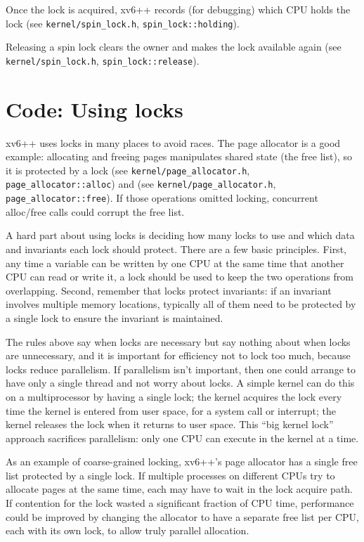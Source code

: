 Once the lock is acquired, xv6++ records (for debugging) which CPU holds the lock
(see \texttt{kernel/spin\_lock.h}, \texttt{spin\_lock::holding}).

Releasing a spin lock clears the owner and makes the lock available again
(see \texttt{kernel/spin\_lock.h}, \texttt{spin\_lock::release}).

\section{Code: Using locks}

xv6++ uses locks in many places to avoid races.
The page allocator is a good example: allocating and freeing pages
manipulates shared state (the free list), so it is protected by a lock
(see \texttt{kernel/page\_allocator.h}, \texttt{page\_allocator::alloc})
and (see \texttt{kernel/page\_allocator.h}, \texttt{page\_allocator::free}).
If those operations omitted locking, concurrent alloc/free calls could corrupt
the free list.

A hard part about using locks is deciding how many locks
to use and which data and invariants each lock should protect.
There are a few basic principles.
First, any time a variable can be written by one CPU
at the same time that another CPU can read or write it,
a lock should be used to keep the two
operations from overlapping.
Second, remember that locks protect invariants:
if an invariant involves multiple memory locations,
typically all of them need to be protected
by a single lock to ensure the invariant is maintained.

The rules above say when locks are necessary but say nothing about when locks
are unnecessary, and it is important for efficiency not to lock too much,
because locks reduce parallelism. If parallelism isn't important, then one
could arrange to have only a single thread and not worry about locks.
A simple kernel can do this on a multiprocessor by having a single lock;
the kernel acquires the lock every time the kernel is entered
from user space, for a system call or interrupt;
the kernel releases the lock when it returns to user space.
This ``big kernel lock'' approach sacrifices parallelism: only one
CPU can execute in the kernel at a time.

As an example of coarse-grained locking, xv6++'s page allocator has a single free list
protected by a single lock. If multiple processes on different CPUs try to allocate pages
at the same time, each may have to wait in the lock acquire path.
If contention for the lock wasted a significant fraction of CPU time,
performance could be improved by changing the allocator to have a separate free list
per CPU, each with its own lock, to allow truly parallel allocation.

